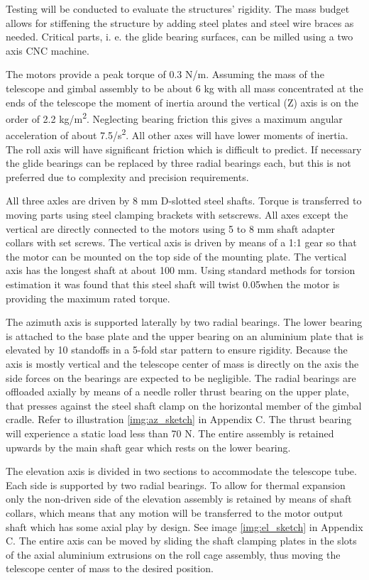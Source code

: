 Testing will be conducted to evaluate the structures' rigidity. The mass budget allows for stiffening the structure by adding steel plates and steel wire braces as needed. Critical parts, i. e. the glide bearing surfaces, can be milled using a two axis CNC machine.

The motors provide a peak torque of 0.3 N/m. Assuming the mass of the telescope and gimbal assembly to be about 6 kg with all mass concentrated at the ends of the telescope the moment of inertia around the vertical (Z) axis is on the order of 2.2 kg/m\textsuperscript{2}. Neglecting bearing friction this gives a maximum angular acceleration of about 7.5\textdegree/s\textsuperscript{2}. All other axes will have lower moments of inertia. The roll axis will have significant friction which is difficult to predict. If necessary the glide bearings can be replaced by three radial bearings each, but this is not preferred due to complexity and precision requirements.


All three axles are driven by 8 mm D-slotted steel shafts. Torque is transferred to moving parts using steel clamping brackets with setscrews. All axes except the vertical are directly connected to the motors using 5 to 8 mm shaft adapter collars with set screws. The vertical axis is driven by means of a 1:1 gear so that the motor can be mounted on the top side of the mounting plate. The vertical axis has the longest shaft at about 100 mm. Using standard methods for torsion estimation it was found that this steel shaft will twist 0.05\textdegree when the motor is providing the maximum rated torque.


The azimuth axis is supported laterally by two radial bearings. The lower bearing is attached to the base plate and the upper bearing on an aluminium plate that is elevated by 10 standoffs in a 5-fold star pattern to ensure rigidity. Because the axis is mostly vertical and the telescope center of mass is directly on the axis the side forces on the bearings are expected to be negligible. The radial bearings are offloaded axially by means of a needle roller thrust bearing on the upper plate, that presses against the steel shaft clamp on the horizontal member of the gimbal cradle. Refer to illustration \ref{img:az_sketch} in Appendix C. The thrust bearing will experience a static load less than 70 N. The entire assembly is retained upwards by the main shaft gear which rests on the lower bearing. 

The elevation axis is divided in two sections to accommodate the telescope tube. Each side is supported by two radial bearings. To allow for thermal expansion only the non-driven side of the elevation assembly is retained by means of shaft collars, which means that any motion will be transferred to the motor output shaft which has some axial play by design. See image \ref{img:el_sketch} in Appendix C. The entire axis can be moved by sliding the shaft clamping plates in the slots of the axial aluminium extrusions on the roll cage assembly, thus moving the telescope center of mass to the desired position. 

